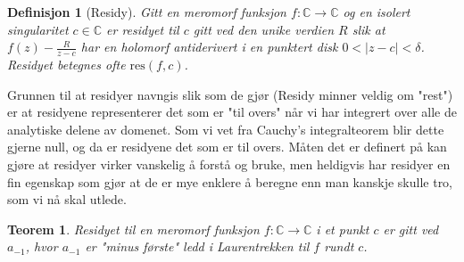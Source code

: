 \documentclass{article}
\newtheorem{theorem}{Teorem}
\newtheorem{definition}{Definisjon}
\begin{document}
\begin{definition}[Residy]
    Gitt en meromorf funksjon $f:\mathbb{C} \longrightarrow \mathbb{C}$ og en isolert singularitet $c \in \mathbb{C}$ er residyet til $c$ gitt ved den unike verdien $R$ slik at $f(z) - \frac{R}{z - c}$ har en holomorf antiderivert i en punktert disk $0 < |z - c| < \delta$. Residyet betegnes ofte $\mathrm{res}(f, c)$.
\end{definition}

Grunnen til at residyer navngis slik som de gjør (Residy minner veldig om "rest") er at residyene representerer det som er "til overs" når vi har integrert over alle de analytiske delene av domenet. Som vi vet fra Cauchy's integralteorem blir dette gjerne null, og da er residyene det som er til overs.
Måten det er definert på kan gjøre at residyer virker vanskelig å forstå og bruke, men heldigvis har residyer en fin egenskap som gjør at de er mye enklere å beregne enn man kanskje skulle tro, som vi nå skal utlede.

\begin{theorem}
    Residyet til en meromorf funksjon $f:\mathbb{C} \longrightarrow \mathbb{C}$ i et punkt $c$ er gitt ved $a_{-1}$, hvor $a_{-1}$ er "minus første" ledd i Laurentrekken til $f$ rundt $c$. 
\end{theorem}
\end{document}

